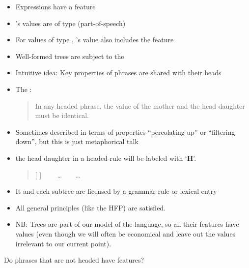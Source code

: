 \documentclass[a4paper,landscape,headrule,footrule]{foils}
\begin{document}
\begin{itemize}
\item Expressions have a feature 
\item {}’s values are of type  (part-of-speech)
\item For  values of type , ’s
  value also includes the feature 
\item Well-formed trees are subject to the 
\end{itemize}

\begin{itemize}
\item Intuitive idea: Key properties of phrases are
shared with their heads
\item The :
  \begin{quote} \large    In any headed phrase, the 
    value of the mother and the head daughter
    must be identical.    
  \end{quote}
\item Sometimes described in terms of properties
“percolating up” or “filtering down”, but this
is just metaphorical talk
\item  the  head daughter in a headed-rule will be labeled with  `{\bf H}'.

  \begin{quote}
    [  ]  \ \ \into  \ \ \ldots \ \ \HD [\ \  \ ]  \ \ \ldots
  \end{quote}


\end{itemize}

\begin{itemize}
\item It and each subtree are licensed by a grammar rule
or lexical entry
\item All general principles (like the HFP) are satisfied.
\item NB: Trees are part of our model of the language,
so all their features have values (even though we
will often be economical and leave out the values
irrelevant to our current point).
\end{itemize}

Do phrases that are not headed have
 features?

\end{document}
